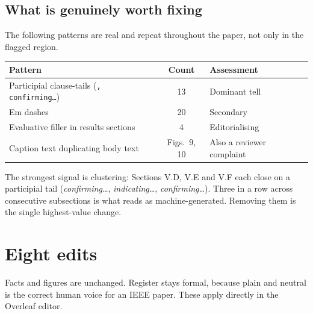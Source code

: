 \documentclass[11pt,a4paper]{article}
\begin{document}
\subsection*{What is genuinely worth fixing}

The following patterns are real and repeat throughout the paper, not only in the
flagged region.

\begin{center}
\begin{tabular}{@{}lcl@{}}
\toprule
\textbf{Pattern} & \textbf{Count} & \textbf{Assessment} \\
\midrule
Participial clause-tails (\texttt{, confirming\ldots}) & 13 & Dominant tell \\
Em dashes                                              & 20 & Secondary \\
Evaluative filler in results sections                  & 4  & Editorialising \\
Caption text duplicating body text                     & Figs.\ 9, 10 & Also a reviewer complaint \\
\bottomrule
\end{tabular}
\end{center}

\noindent
The strongest signal is clustering: Sections V.D, V.E and V.F each close on a
participial tail (\emph{confirming\ldots}, \emph{indicating\ldots},
\emph{confirming\ldots}). Three in a row across consecutive subsections is what
reads as machine-generated. Removing them is the single highest-value change.

\section{Eight edits}

Facts and figures are unchanged. Register stays formal, because plain and
neutral is the correct human voice for an IEEE paper. These apply directly in
the Overleaf editor.
\end{document}
